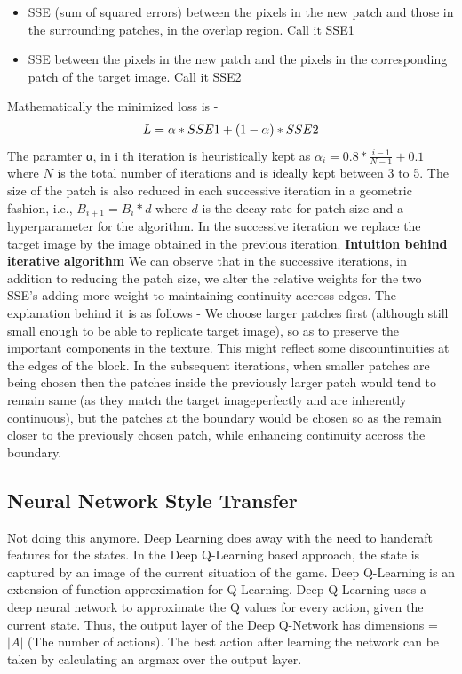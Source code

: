 \documentclass[10pt,twocolumn,letterpaper]{article}
\begin{document}
\begin{itemize}
    \item SSE (sum of squared errors) between the pixels in the
    new patch and those in the surrounding patches, in the
    overlap region. Call it SSE1
    \item SSE between the pixels in the new patch and the pixels
    in the corresponding patch of the target image. Call it
    SSE2
\end{itemize}
\newline
Mathematically the minimized loss is -
\begin{align}
L = \alpha *SSE1 + (1 - \alpha) *SSE2\notag
\end{align}
The paramter α, in i th iteration is heuristically kept
as $\alpha_i = 0.8*\frac{i-1}{N-1}+0.1$
where $N$ is the total number
of iterations and is ideally kept between 3 to 5. The size
of the patch is also reduced in each successive iteration
in a geometric fashion, i.e., $B_{i+1} = B_i *d$ where $d$ is
the decay rate for patch size and a hyperparameter for
the algorithm. In the successive iteration we replace the
target image by the image obtained in the previous iteration.
\newline
\newline
\textbf{Intuition behind iterative algorithm} We can observe
that in the successive iterations, in addition to reducing
the patch size, we alter the relative weights for the two
SSE’s adding more weight to maintaining continuity
accross edges. The explanation behind it is as follows -
We choose larger patches first (although still small enough
to be able to replicate target image), so as to preserve the
important components in the texture. This might reflect
some discountinuities at the edges of the block. In the
subsequent iterations, when smaller patches are being
chosen then the patches inside the previously larger patch
would tend to remain same (as they match the target imageperfectly and are inherently continuous), but the patches at
the boundary would be chosen so as the remain closer to
the previously chosen patch, while enhancing continuity
accross the boundary.

\subsection{Neural Network Style Transfer}
Not doing this anymore.
Deep Learning does away with the need to handcraft features for the states. In the Deep Q-Learning based approach, the state is captured by an image of the current situation of the game. %
Deep Q-Learning is an extension of function approximation for Q-Learning. Deep Q-Learning uses a deep neural network to approximate the Q values for every action, given the current state. Thus, the output layer of the Deep Q-Network has dimensions = $|A|$ (The number of actions). The best action after learning the network can be taken by calculating an argmax over the output layer. 
\end{document}
